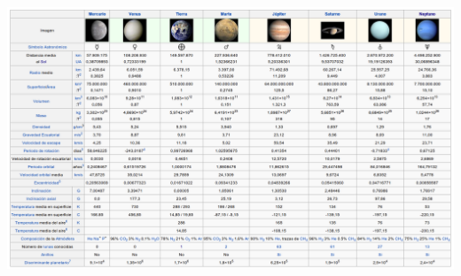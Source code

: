 \documentclass[a4paper,12pt]{article}
\begin{document}
\centering \includegraphics[height=27cm]{planetas.png}
\end{document}
